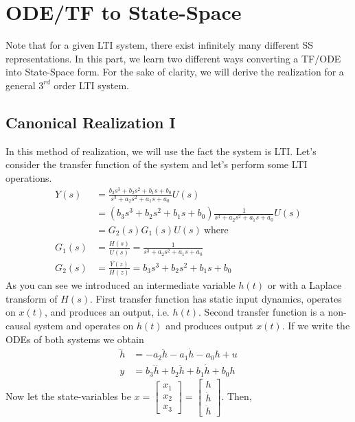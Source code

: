\documentclass[twoside]{article}
\begin{document}
\section{ODE/TF to State-Space}

Note that for a given LTI system, there exist infinitely many 
different SS representations. In this part, we learn two different ways 
converting a TF/ODE into State-Space form. For the sake of clarity, 
we will derive the realization for a general $3^{rd}$ order LTI system.

\subsection{Canonical Realization I}

In this method of realization, we will use the fact the system is
LTI. Let's consider the transfer function of the system and let's 
perform some LTI operations.
%
\begin{align*}
Y(s) &= \frac{ b_3 s^3 + b_2 s^2  + b_1 s + b_0 }{ s^3 + a_2 s^2 + a_1 s + a_0} U(s)
\\
&= \left( b_3 s^3 + b_2 s^2  + b_1 s + b_0 \right)  
\frac{1}{ s^3 + a_2 s^2 + a_1 s + a_0 } U(s) 
\\
&= G_2(s) G_1(s) U(s) \ \mathrm{where} 
\\
G_1(s) &= \frac{H(s)}{U(s)} = \frac{1}{ s^3 + a_2 s^2 + a_1 s + a_0 } 
\\
G_2(s) &= \frac{Y(z)}{H(z)} = b_3 s^3 + b_2 s^2  + b_1 s + b_0
\end{align*}
%
As you can see we introduced an intermediate variable $h(t)$ or with a
Laplace transform of $H(s)$. First transfer function has static input
dynamics, operates on $x(t)$, and produces an output, i.e. $h(t)$. 
Second transfer function is a non-causal system and operates on $h(t)$ and produces output
$x(t)$. If we write the ODEs of both systems we obtain
%
\begin{align*}
\dddot{h} &= -a_2 \ddot{h} - a_1 \dot{h} - a_0 h + u
\\
y &= b_3 \dddot{h} + b_2 \ddot{h} + b_1 \dot{h} + b_0 h
\end{align*}
%
Now let the state-variables be 
$x = \left[ \begin{array}{c} x_1 \\ x_2 \\ x_3 \end{array} \right] 
= \left[ \begin{array}{c} h \\ \dot{h} \\ \ddot{h} \end{array} \right]$. Then,
\end{document}
